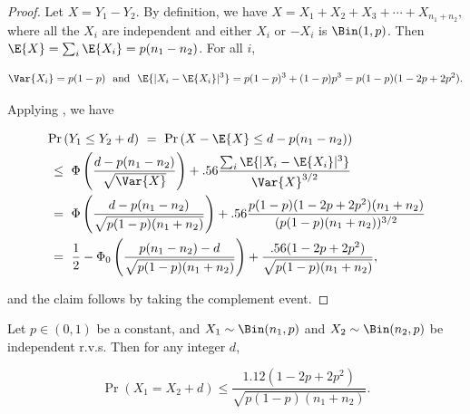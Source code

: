 \documentclass{toc}
\begin{document}
			\begin{proof}
				Let $X = Y_1 - Y_2$. By definition, we have
				$
				X = X_1 + X_2 + X_3 + \cdots + X_{n_1+n_2},
				$
				where all %
				the $X_i$   %
				are independent and either $X_i$ or $-X_i$ is $\Bin(1, p)$.
				Then $\E{X} = \sum_i\E{X_i} = p(n_1 - n_2)$.
				For all $i$,
				\begin{linenomath}\begin{equation*}
						\Var{X_i} = p(1 - p) \ \text{ and } \ \E{|X_i - \E{X_i}|^3} = p(1 - p)^3 + (1 - p)p^3 = p(1 - p)(1 - 2p + 2p^2).
				\end{equation*}\end{linenomath}
				Applying , we have
				\begin{linenomath}\begin{equation*} \label{eq:temp68}
						\begin{aligned}
							& \Pr\left(Y_1 \le Y_2 + d\right) \ = \ \Pr\left(X - \E{X} \le d - p(n_1 - n_2)\right)
							\\
							& \ \le \ \Phi\left(\frac{d - p(n_1 - n_2)}{\sqrt{\Var{X}}} \right)
							+ .56 \frac{\sum_i \E{|X_i - \E{X_i}|^3} }{\Var{X}^{3/2}}
							\\
							& \ = \ \Phi\left(\frac{d - p(n_1 - n_2)}{\sqrt{p(1 - p)(n_1 + n_2)}} \right)
							+ .56 \frac{p(1 - p) (1 - 2p + 2p^2)(n_1 + n_2) }{(p(1 - p)(n_1 + n_2))^{3/2}}
							\\
							& \ = \ \frac{1}{2} - \Phi_0\left(\frac{p(n_1 - n_2) - d}{\sqrt{p(1 - p)(n_1 + n_2)}} \right)
							+ \frac{.56(1 - 2p + 2p^2) }{\sqrt{p(1 - p)(n_1 + n_2)}},
						\end{aligned}
				\end{equation*}\end{linenomath}
				and the claim follows by taking the complement event.
			\end{proof}
			
			\begin{lemma} \label{thm:1/sqrt{n}}
				Let $p \in (0, 1)$ be a constant, and $X_1 \sim \Bin(n_1, p)$ and $X_2 \sim \Bin(n_2, p)$ be independent r.v.s. Then for any integer $d$,
				\begin{linenomath}\begin{equation*}
						\Pr\left(X_1 = X_2 + d \right) \le \frac{1.12\left(1 - 2p + 2p^2\right)}{\sqrt{p(1 - p)(n_1 + n_2)}}.
				\end{equation*}\end{linenomath}
			\end{lemma}
			
\end{document}
